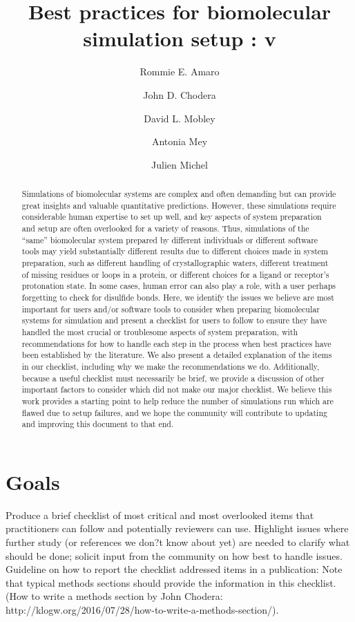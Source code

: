 \documentclass[9pt]{livecoms}
\title{Best practices for biomolecular simulation setup : v\versionnumber}
\author[1*]{Rommie E. Amaro}
\author[2*]{John D. Chodera}
\author[3*]{David L. Mobley}
\author[4*]{Antonia Mey}
\author[4*]{Julien Michel}
\affil[1]{Institution 1}
\affil[2]{Institution 2}
\affil[3]{Departments of Pharmaceutical Sciences and Chemistry, University of California, Irvine}
\affil[4]{Institution 4}
\begin{document}
\maketitle

\begin{abstract}
Simulations of biomolecular systems are complex and often demanding but can provide great insights and valuable quantitative predictions. 
However, these simulations require considerable human expertise to set up well, and key aspects of system preparation and setup are often overlooked for a variety of reasons.
Thus, simulations of the ``same'' biomolecular system prepared by different individuals or different software tools may yield substantially different results due to different choices made in system preparation, such as different handling of crystallographic waters, different treatment of missing residues or loops in a protein, or different choices for a ligand or receptor's protonation state. 
In some cases, human error can also play a role, with a user perhaps forgetting to check for disulfide bonds. 
Here, we identify the issues we believe are most important for users and/or software tools to consider when preparing biomolecular systems for simulation and present a checklist for users to follow to ensure they have handled the most crucial or troublesome aspects of system preparation, with recommendations for how to handle each step in the process when best practices have been established by the literature.
We also present a detailed explanation of the items in our checklist, including why we make the recommendations we do.
Additionally, because a useful checklist must necessarily be brief, we provide a discussion of other important factors to consider which did not make our major checklist. 
We believe this work provides a starting point to help reduce the number of simulations run which are flawed due to setup failures, and we hope the community will contribute to updating and improving this document to that end.

\end{abstract}

\section{Goals}

Produce a brief checklist of most critical and most overlooked items that practitioners can follow and potentially reviewers can use.
Highlight issues where further study (or references we don?t know about yet) are needed to clarify what should be done; solicit input from the community on how best to handle issues.
Guideline on how to report the checklist addressed items in a publication: Note that typical methods sections should provide the information in this checklist. (How to write a methods section by John Chodera: http://klogw.org/2016/07/28/how-to-write-a-methods-section/).
\end{document}
